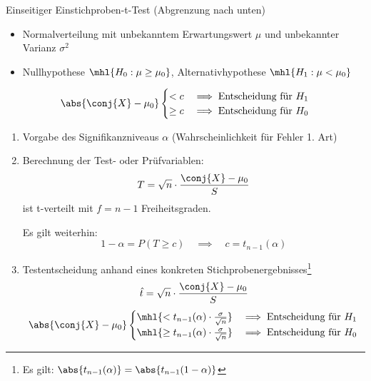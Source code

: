 \begin{algo}{Einseitiger Einstichproben-t-Test (Abgrenzung nach unten)}
    \begin{itemize}
        \item Normalverteilung mit unbekanntem Erwartungswert $\mu$ und unbekannter Varianz $\sigma^2$
        \item Nullhypothese $\mhl{H_0: \mu \geq \mu_0}$, Alternativhypothese $\mhl{H_1: \mu < \mu_0}$
    \end{itemize}
    \[
        \abs{\conj{X} - \mu_0}
        \begin{cases}
            < c    & \implies \text{Entscheidung für $H_1$} \\
            \geq c & \implies \text{Entscheidung für $H_0$}
        \end{cases}
    \]

    \begin{enumerate}
        \item Vorgabe des Signifikanzniveaus $\alpha$ (Wahrscheinlichkeit für Fehler 1. Art)
        \item Berechnung der Test- oder Prüfvariablen:
              \[
                  T = \sqrt{n} \cdot \frac{\conj{X} - \mu_0}{S}
              \]
              ist t-verteilt mit $f = n-1$ Freiheitsgraden.

              Es gilt weiterhin:
              \[
                  1 - \alpha = P(T \geq c) \quad \implies \quad c = t_{n-1} (\alpha)
              \]
        \item Testentscheidung anhand eines konkreten Stichprobenergebnisses\footnote{Es gilt: $\abs{t_{n-1} (\alpha)} = \abs{t_{n-1} (1-\alpha)}$}
              \[
                  \hat{t} = \sqrt{n} \cdot \frac{\conj{X} - \mu_0}{S}
              \]
              \[
                  \abs{\conj{X} - \mu_0}
                  \begin{cases}
                      \mhl{ < t_{n-1} (\alpha) \cdot \frac{\sigma}{\sqrt{n}}   } & \implies \text{Entscheidung für $H_1$} \\
                      \mhl{ \geq t_{n-1} (\alpha) \cdot \frac{\sigma}{\sqrt{n}}} & \implies \text{Entscheidung für $H_0$}
                  \end{cases}
              \]
    \end{enumerate}
\end{algo}

